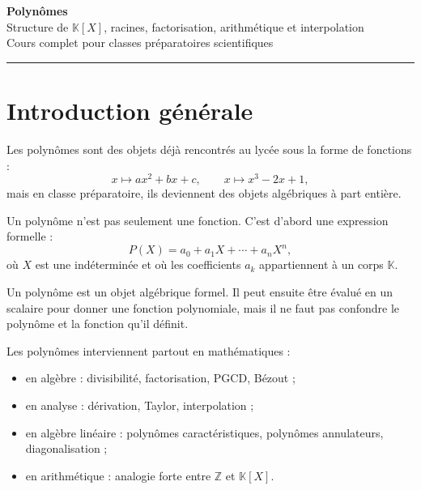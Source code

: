 \documentclass[11pt,a4paper]{article}
\newcommand{\K}{\mathbb K}
\newcommand{\Z}{\mathbb Z}
\begin{document}
\begin{center}
    {\Huge \textbf{Polynômes}}\\[2mm]
    {\Large Structure de \(\K[X]\), racines, factorisation, arithmétique et interpolation}\\[2mm]
    {\large Cours complet pour classes préparatoires scientifiques}\\[2mm]
    \rule{0.88\linewidth}{0.5pt}
\end{center}

\vspace{0.4cm}

\tableofcontents

\newpage

\section*{Introduction générale}

Les polynômes sont des objets déjà rencontrés au lycée sous la forme de fonctions :
\[
x\longmapsto ax^2+bx+c,
\qquad
x\longmapsto x^3-2x+1,
\]
mais en classe préparatoire, ils deviennent des objets algébriques à part entière.

Un polynôme n'est pas seulement une fonction.  
C'est d'abord une expression formelle :
\[
P(X)=a_0+a_1X+\cdots+a_nX^n,
\]
où \(X\) est une indéterminée et où les coefficients \(a_k\) appartiennent à un corps \(\K\).

\begin{retenirbox}
Un polynôme est un objet algébrique formel.  
Il peut ensuite être évalué en un scalaire pour donner une fonction polynomiale, mais il ne faut pas confondre le polynôme et la fonction qu'il définit.
\end{retenirbox}

Les polynômes interviennent partout en mathématiques :
\begin{itemize}
    \item en algèbre : divisibilité, factorisation, PGCD, Bézout ;
    \item en analyse : dérivation, Taylor, interpolation ;
    \item en algèbre linéaire : polynômes caractéristiques, polynômes annulateurs, diagonalisation ;
    \item en arithmétique : analogie forte entre \(\Z\) et \(\K[X]\).
\end{itemize}
\end{document}
